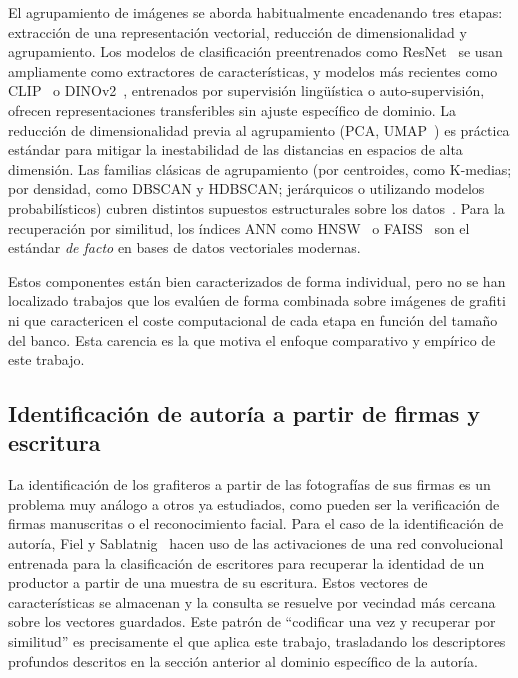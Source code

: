 El agrupamiento de imágenes se aborda habitualmente encadenando tres etapas:
extracción de una representación vectorial, reducción de dimensionalidad y
agrupamiento. Los modelos de clasificación preentrenados como
ResNet~\cite{he_deep_2015} se usan ampliamente como extractores de
características, y modelos más recientes como CLIP~\cite{radford_learning_2021}
o DINOv2~\cite{oquab_dinov2_2024}, entrenados por supervisión lingüística o
auto-supervisión, ofrecen representaciones transferibles sin ajuste específico
de dominio. La reducción de dimensionalidad previa al agrupamiento (PCA,
UMAP~\cite{mcinnes_umap_2020}) es práctica estándar para mitigar la
inestabilidad de las distancias en espacios de alta dimensión. Las familias
clásicas de agrupamiento (por centroides, como K-medias; por densidad, como
DBSCAN y HDBSCAN; jerárquicos o utilizando modelos probabilísticos) cubren
distintos supuestos estructurales sobre los
datos~\cite{ester_density-based_1996,campello_density-based_2013,arthur_k-means_2007}. Para la recuperación por similitud, los índices ANN como
HNSW~\cite{malkov_efficient_2018} o FAISS~\cite{johnson_billion-scale_2017} son
el estándar \textit{de facto} en bases de datos vectoriales modernas.

Estos componentes están bien caracterizados de forma individual, pero no se han
localizado trabajos que los evalúen de forma combinada sobre imágenes de
grafiti ni que caractericen el coste computacional de cada etapa en función del
tamaño del banco. Esta carencia es la que motiva el enfoque comparativo y
empírico de este trabajo.

\subsection{Identificación de autoría a partir de firmas y escritura}
\label{subsec:art-author-id}

La identificación de los grafiteros a partir de las fotografías de sus firmas
es un problema muy análogo a otros ya estudiados, como pueden ser la
verificación de firmas manuscritas o el reconocimiento facial. Para el caso de
la identificación de autoría, Fiel y Sablatnig~\cite{fiel_writer_2015} hacen
uso de las activaciones de una red convolucional entrenada para la
clasificación de escritores para recuperar la identidad de un productor a
partir de una muestra de su escritura. Estos vectores de características se
almacenan y la consulta se resuelve por vecindad más cercana sobre los vectores
guardados. Este patrón de \enquote{codificar una vez y recuperar por similitud}
es precisamente el que aplica este trabajo, trasladando los descriptores
profundos descritos en la sección anterior al dominio específico de la autoría.


